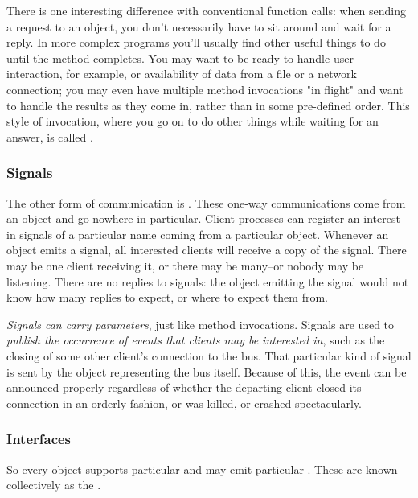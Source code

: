 \documentclass{myproc}
\begin{document}
There is one interesting difference with conventional function calls: when
sending a request to an object, you don't necessarily have to sit around and
wait for a reply. In more complex programs you'll usually find other useful
things to do until the method completes. You may want to be ready to handle
user interaction, for example, or availability of data from a file or a
network connection; you may even have multiple method invocations "in flight"
and want to handle the results as they come in, rather than in some
pre-defined order. This style of invocation, where you go on to do other
things while waiting for an answer, is called . 

\subsubsection{Signals}
The other form of communication is . 
These one-way communications come from an object and go nowhere in
particular. Client processes can register an interest in signals of a
particular name coming from a particular object. Whenever an object emits a
signal, all interested clients will receive a copy of the signal. There may be
one client receiving it, or there may be many--or nobody may be
listening. There are no replies to signals: the object emitting the signal
would not know how many replies to expect, or where to expect them from. 



{\em Signals can carry parameters\/}, just like method invocations. 
Signals are used to {\em publish the occurrence of events that clients may be
interested in\/}, such as the closing of some other client's connection to the 
bus. That particular kind of signal is sent by the object representing the bus
itself. Because of this, the event can be announced properly regardless of
whether the departing client closed its connection in an orderly fashion, or
was killed, or crashed spectacularly. 


\subsubsection{Interfaces}
So every object supports particular  and may emit particular
. These are known collectively as the . 
\end{document}
